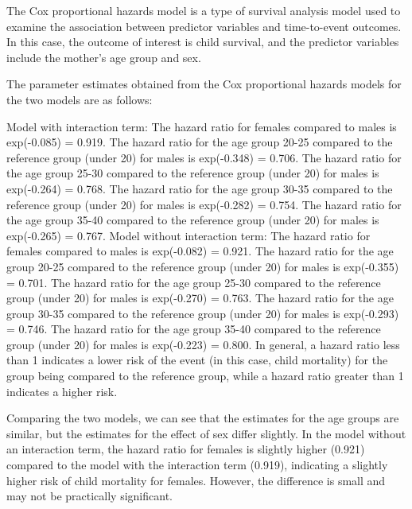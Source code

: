 \documentclass[
]{article}
\begin{document}
The Cox proportional hazards model is a type of survival analysis model
used to examine the association between predictor variables and
time-to-event outcomes. In this case, the outcome of interest is child
survival, and the predictor variables include the mother's age group and
sex.

The parameter estimates obtained from the Cox proportional hazards
models for the two models are as follows:

Model with interaction term: The hazard ratio for females compared to
males is exp(-0.085) = 0.919. The hazard ratio for the age group 20-25
compared to the reference group (under 20) for males is exp(-0.348) =
0.706. The hazard ratio for the age group 25-30 compared to the
reference group (under 20) for males is exp(-0.264) = 0.768. The hazard
ratio for the age group 30-35 compared to the reference group (under 20)
for males is exp(-0.282) = 0.754. The hazard ratio for the age group
35-40 compared to the reference group (under 20) for males is
exp(-0.265) = 0.767. Model without interaction term: The hazard ratio
for females compared to males is exp(-0.082) = 0.921. The hazard ratio
for the age group 20-25 compared to the reference group (under 20) for
males is exp(-0.355) = 0.701. The hazard ratio for the age group 25-30
compared to the reference group (under 20) for males is exp(-0.270) =
0.763. The hazard ratio for the age group 30-35 compared to the
reference group (under 20) for males is exp(-0.293) = 0.746. The hazard
ratio for the age group 35-40 compared to the reference group (under 20)
for males is exp(-0.223) = 0.800. In general, a hazard ratio less than 1
indicates a lower risk of the event (in this case, child mortality) for
the group being compared to the reference group, while a hazard ratio
greater than 1 indicates a higher risk.

Comparing the two models, we can see that the estimates for the age
groups are similar, but the estimates for the effect of sex differ
slightly. In the model without an interaction term, the hazard ratio for
females is slightly higher (0.921) compared to the model with the
interaction term (0.919), indicating a slightly higher risk of child
mortality for females. However, the difference is small and may not be
practically significant.
\end{document}
